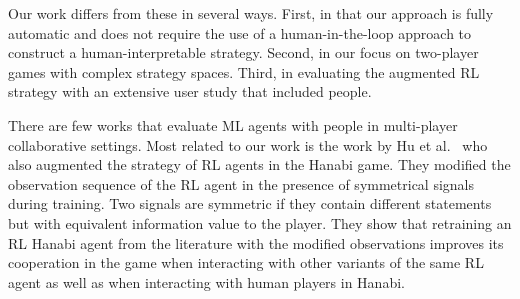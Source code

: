 \documentclass[letterpaper]{article} %
\begin{document}
Our work differs from these in several ways. First, in that our  approach is fully automatic and does not require the use of   a human-in-the-loop approach to construct a human-interpretable strategy. Second, in our focus on two-player games with complex strategy spaces. Third, in  evaluating  the augmented RL strategy with an extensive  user study that included people.



There are few works that evaluate ML agents with people in multi-player collaborative
settings. Most related to our work is the work by Hu et al.~ who also  augmented
the strategy of RL agents in the Hanabi game. They modified the observation sequence of the RL agent in the presence of symmetrical signals during training. Two signals are symmetric if they  contain different statements  but with equivalent information value to the player.
They show that retraining an RL Hanabi  agent from the literature   with the modified observations improves its cooperation in the game when interacting with other variants of the same RL agent as well as when interacting with human players in Hanabi.
\end{document}
